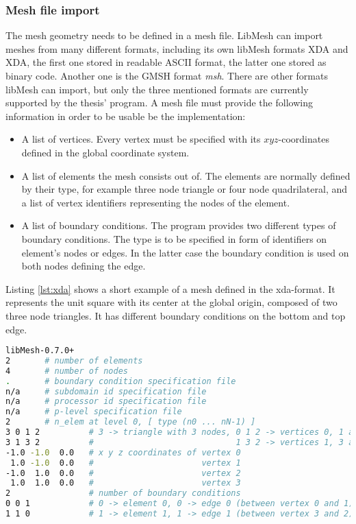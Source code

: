   \subsubsection{Mesh file import}\label{sec:Impl-Details-MeshFileImport}
   The mesh geometry needs to be defined in a mesh file. LibMesh can import meshes from many different formats, including its own libMesh formats XDA and XDA, the first one stored in readable ASCII format, the latter one stored as binary code. Another one is the GMSH format \textit{msh}. There are other formats libMesh can import, but only the three mentioned formats are currently supported by the thesis' program.
   A mesh file must provide the following information in order to be usable be the implementation:
   \begin{itemize}
   	\item A list of vertices. Every vertex must be specified with its $xyz$-coordinates defined in the global coordinate system.
   	\item A list of elements the mesh consists out of. The elements are normally defined by their type, for example three node triangle or four node quadrilateral, and a list of vertex identifiers representing the nodes of the element.
   	\item A list of boundary conditions. The program provides two different types of boundary conditions. The type is to be specified in form of identifiers on element's nodes or edges. In the latter case the boundary condition is used on both nodes defining the edge.
   \end{itemize}
   Listing \ref{lst:xda} shows a short example of a mesh defined in the xda-format. It represents the unit square with its center at the global origin, composed of two three node triangles. It has different boundary conditions on the bottom and top edge.
\begin{lstlisting}[caption=Example xda mesh file,label=lst:xda,language=bash,keepspaces=true]
libMesh-0.7.0+
2       # number of elements
4       # number of nodes
.       # boundary condition specification file
n/a     # subdomain id specification file
n/a     # processor id specification file
n/a     # p-level specification file
2       # n_elem at level 0, [ type (n0 ... nN-1) ]
3 0 1 2          # 3 -> triangle with 3 nodes, 0 1 2 -> vertices 0, 1 and 2
3 1 3 2          #                             1 3 2 -> vertices 1, 3 and 2
-1.0 -1.0  0.0   # x y z coordinates of vertex 0
 1.0 -1.0  0.0   #                      vertex 1
-1.0  1.0  0.0   #                      vertex 2
 1.0  1.0  0.0   #                      vertex 3
2                # number of boundary conditions
0 0 1            # 0 -> element 0, 0 -> edge 0 (between vertex 0 and 1), bc-type 1
1 1 0            # 1 -> element 1, 1 -> edge 1 (between vertex 3 and 2), bc-type 0
\end{lstlisting}
